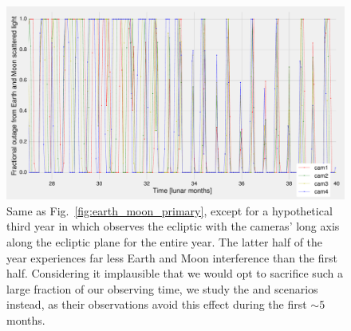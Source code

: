\begin{figure}[!tb]
	\centering
	\includegraphics[angle=90,width=1.05\textwidth]{figures/outage_earth_moon_ecl_narrow_1yr.pdf}
	\caption{Same as Fig.~\protect\ref{fig:earth_moon_primary}, except for a hypothetical third year in which \tess observes the ecliptic with the cameras' long axis along the ecliptic plane for the entire year. The latter half of the year experiences far less Earth and Moon interference than the first half. Considering it implausible that we would opt to sacrifice such a large fraction of our observing time, we study the \elong\:and \eshort\:scenarios instead, as their observations avoid this effect during the first $\sim5$ months.}
	\label{fig:earth_moon_elong}
\end{figure}
